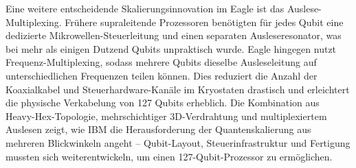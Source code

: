 Eine weitere entscheidende Skalierungsinnovation im Eagle ist das Auslese-Multiplexing. Frühere supraleitende Prozessoren benötigten für jedes Qubit eine dedizierte Mikrowellen-Steuerleitung und einen separaten Ausleseresonator, was bei mehr als einigen Dutzend Qubits unpraktisch wurde. Eagle hingegen nutzt Frequenz-Multiplexing, sodass mehrere Qubits dieselbe Ausleseleitung auf unterschiedlichen Frequenzen teilen können. Dies reduziert die Anzahl der Koaxialkabel und Steuerhardware-Kanäle im Kryostaten drastisch und erleichtert die physische Verkabelung von 127 Qubits erheblich. Die Kombination aus Heavy-Hex-Topologie, mehrschichtiger 3D-Verdrahtung und multiplexiertem Auslesen zeigt, wie IBM die Herausforderung der Quantenskalierung aus mehreren Blickwinkeln angeht – Qubit-Layout, Steuerinfrastruktur und Fertigung mussten sich weiterentwickeln, um einen 127-Qubit-Prozessor zu ermöglichen.


